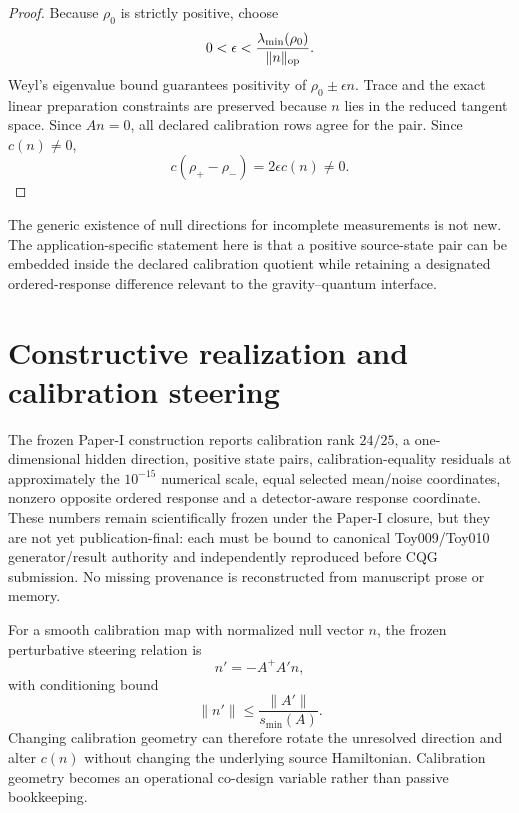 \documentclass[12pt]{article}
\begin{document}
\begin{proof}
Because $\rho_0$ is strictly positive, choose
\begin{equation}
 0<\epsilon<\frac{\lambda_{\min}(\rho_0)}{\lVert n\rVert_{\rm op}}.
\end{equation}
Weyl's eigenvalue bound guarantees positivity of $\rho_0\pm\epsilon n$. Trace and the exact linear preparation constraints are preserved because $n$ lies in the reduced tangent space. Since $An=0$, all declared calibration rows agree for the pair. Since $c(n)\neq0$,
\begin{equation}
 c(\rho_+-\rho_-)=2\epsilon c(n)\neq0.
\end{equation}
\end{proof}

The generic existence of null directions for incomplete measurements is not new. The application-specific statement here is that a positive source-state pair can be embedded inside the declared calibration quotient while retaining a designated ordered-response difference relevant to the gravity--quantum interface.

\section{Constructive realization and calibration steering}

The frozen Paper-I construction reports calibration rank $24/25$, a one-dimensional hidden direction, positive state pairs, calibration-equality residuals at approximately the $10^{-15}$ numerical scale, equal selected mean/noise coordinates, nonzero opposite ordered response and a detector-aware response coordinate. These numbers remain scientifically frozen under the Paper-I closure, but they are not yet publication-final: each must be bound to canonical Toy009/Toy010 generator/result authority and independently reproduced before CQG submission. No missing provenance is reconstructed from manuscript prose or memory.

For a smooth calibration map with normalized null vector $n$, the frozen perturbative steering relation is
\begin{equation}
 n'=-A^+A'n,
\end{equation}
with conditioning bound
\begin{equation}
 \lVert n'\rVert\leq\frac{\lVert A'\rVert}{s_{\min}(A)}.
\end{equation}
Changing calibration geometry can therefore rotate the unresolved direction and alter $c(n)$ without changing the underlying source Hamiltonian. Calibration geometry becomes an operational co-design variable rather than passive bookkeeping.
\end{document}

